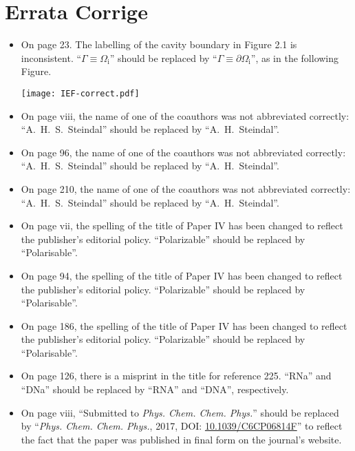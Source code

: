 \pagestyle{empty}

\chapter*{Errata Corrige}

\begin{itemize}
\item On page 23. The labelling of the cavity boundary in Figure 2.1 is
inconsistent. \enquote{$\Gamma\equiv\Omega_\mathrm{i}$} should be replaced by
\enquote{$\Gamma\equiv\partial\Omega_\mathrm{i}$}, as in the following Figure.
  \begin{figure*}[!h]
    \centering
    \texttt{[image: IEF-correct.pdf]}
  \end{figure*}
\item On page viii, the name of one of the coauthors was not abbreviated
correctly: \enquote{A.~H.~S.~Steindal} should be replaced by \enquote{A.~H.~Steindal}.
\item On page 96, the name of one of the coauthors was not abbreviated
correctly: \enquote{A.~H.~S.~Steindal} should be replaced by \enquote{A.~H.~Steindal}.
\item On page 210, the name of one of the coauthors was not abbreviated
correctly: \enquote{A.~H.~S.~Steindal} should be replaced by \enquote{A.~H.~Steindal}.
\item On page vii, the spelling of the title of Paper IV has been changed to
reflect the publisher's editorial policy. \enquote{Polarizable} should be
replaced by \enquote{Polarisable}.
\item On page 94, the spelling of the title of Paper IV has been changed to
reflect the publisher's editorial policy. \enquote{Polarizable} should be
replaced by \enquote{Polarisable}.
\item On page 186, the spelling of the title of Paper IV has been changed to
reflect the publisher's editorial policy. \enquote{Polarizable} should be
replaced by \enquote{Polarisable}.
\item On page 126, there is a misprint in the title for reference 225.
\enquote{RNa} and \enquote{DNa} should be replaced by \enquote{RNA} and
\enquote{DNA}, respectively.
\item On page viii, \enquote{Submitted to \textit{Phys. Chem. Chem. Phys.}}
should be replaced by \enquote{\textit{Phys. Chem. Chem. Phys.}, 2017, DOI:
\url{10.1039/C6CP06814F}} to reflect the fact that the paper was published in
final form on the journal's website.

\end{itemize}
